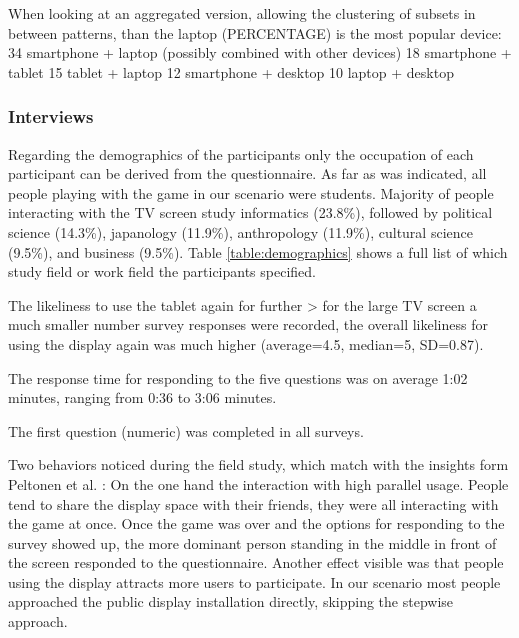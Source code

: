 	When looking at an aggregated version, allowing the clustering of subsets in between patterns, than the laptop (PERCENTAGE) is the most popular device:
		34 	smartphone + laptop (possibly combined with other devices)
		18	smartphone + tablet
		15	tablet + laptop
		12	smartphone + desktop
		10 	laptop + desktop




	\subsubsection{Interviews}

	Regarding the demographics of the participants only the occupation of each participant can be derived from the questionnaire. As far as was indicated, all people playing with the game in our scenario were students. Majority of people interacting with the TV screen study informatics (23.8\%), followed by political science (14.3\%), japanology (11.9\%), anthropology (11.9\%), cultural science (9.5\%), and business (9.5\%). Table \ref{table:demographics} shows a full list of which study field or work field the participants specified.

	The likeliness to use the tablet again for further 
		> for the large TV screen a much smaller number survey responses were recorded, the overall likeliness for using the display again was much higher (average=4.5, median=5, SD=0.87).


		The response time for responding to the five questions was on average 1:02 minutes, ranging from 0:36 to 3:06 minutes.




	The first question (numeric) was completed in all surveys. 









Two behaviors noticed during the field study, which match with the insights form Peltonen et al. \cite{peltonen2008s}: On the one hand the interaction with high parallel usage. People tend to share the display space with their friends, they were all interacting with the game at once. Once the game was over and the options for responding to the survey showed up, the more dominant person standing in the middle in front of the screen responded to the questionnaire. Another effect visible was that people using the display attracts more users to participate. In our scenario most people approached the public display installation directly, skipping the stepwise approach.







